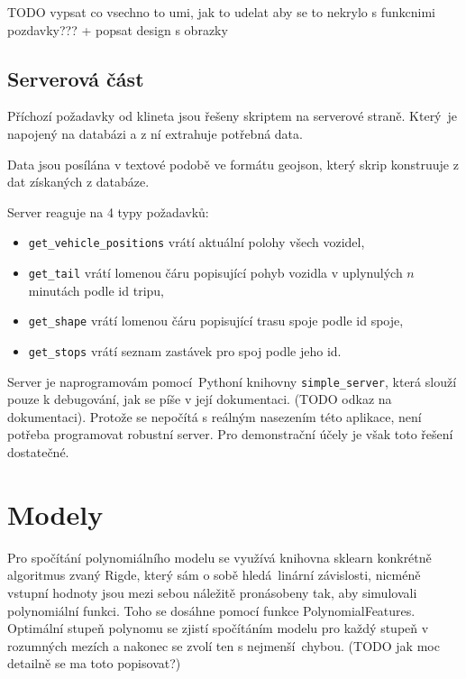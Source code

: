 TODO vypsat co vsechno to umi, jak to udelat aby se to nekrylo s funkcnimi pozdavky??? + popsat design s obrazky


\subsection{Serverová část}

Příchozí požadavky od klineta jsou řešeny skriptem na serverové straně. Který je napojený na databázi a z ní extrahuje potřebná data.

\bigbreak

Data jsou posílána v textové podobě ve formátu \gls{geojson}, který skrip konstruuje z dat získaných z databáze.

\bigbreak

Server reaguje na 4 typy požadavků:

\begin{itemize}
	\item \verb-get_vehicle_positions- vrátí aktuální polohy všech vozidel,

	\item \verb-get_tail- vrátí lomenou čáru popisující pohyb vozidla v uplynulých $n$ minutách podle id tripu,

	\item \verb-get_shape- vrátí lomenou čáru popisující trasu spoje podle id spoje,

	\item \verb-get_stops- vrátí seznam zastávek pro spoj podle jeho id.
\end{itemize}

\bigbreak

Server je naprogramovám pomocí Pythoní knihovny \verb-simple_server-, která slouží pouze k debugování, jak se píše v její dokumentaci. (TODO odkaz na dokumentaci). Protože se nepočítá s reálným nasezením této aplikace, není potřeba programovat robustní server. Pro demonstrační účely je však toto řešení dostatečné.




\section{Modely}


Pro spočítání polynomiálního modelu se využívá knihovna sklearn konkrétně algoritmus zvaný Rigde, který sám o sobě hledá linární závislosti, nicméně vstupní hodnoty jsou mezi sebou náležitě pronásobeny tak, aby simulovali polynomiální funkci. Toho se dosáhne pomocí funkce PolynomialFeatures. Optimální stupeň polynomu se zjistí spočítáním modelu pro každý stupeň v rozumných mezích a nakonec se zvolí ten s nejmenší chybou. (TODO jak moc detailně se ma toto popisovat?)



















